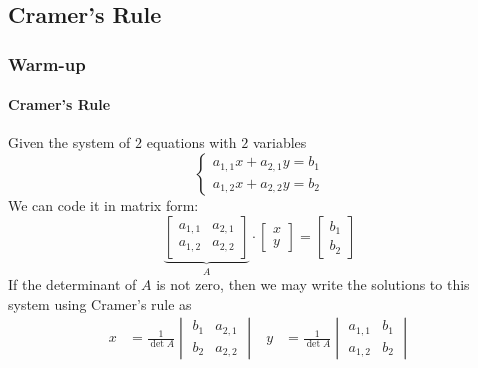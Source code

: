 \documentclass[9pt,xcolor=x11names,compress]{beamer}
\begin{document}
\subsection{Cramer's Rule}
\begin{frame}\frametitle{Warm-up}
\framesubtitle{Cramer's Rule}
Given the system of $2$ equations with $2$ variables
\begin{equation*}
	\begin{cases}
		a_{1,1} x + a_{2,1} y =b_1 \\
		a_{1,2} x + a_{2,2} y =b_2
	\end{cases}
\end{equation*}
We can code it in matrix form:
\begin{equation*}
	\underbrace{\begin{bmatrix}
	a_{1,1} & a_{2,1} \\
	a_{1,2} & a_{2,2}
	\end{bmatrix}}_{A} \cdot
	\begin{bmatrix}
		x\\ y 
	\end{bmatrix} = 
	\begin{bmatrix}
		b_1 \\ b_2 
	\end{bmatrix}
\end{equation*}
If the determinant of $A$ is not zero, then we may write the solutions to this system using Cramer's rule as
\begin{align*}
	x &= \frac{1}{\det A} \begin{vmatrix}
		b_1 & a_{2,1} \\ b_2 & a_{2,2}
	\end{vmatrix} &
	y &= \frac{1}{\det A} \begin{vmatrix}
		a_{1,1} & b_1 \\ a_{1,2} & b_2
	\end{vmatrix}
\end{align*}
\end{frame}
\end{document}
